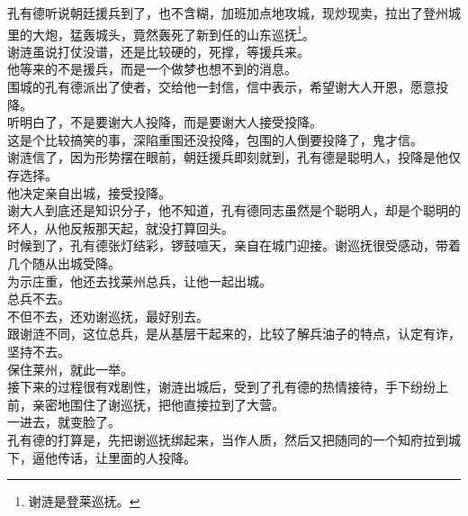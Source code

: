\begin{multicols}{\theparacolNo}
孔有德听说朝廷援兵到了，也不含糊，加班加点地攻城，现炒现卖，拉出了登州城里的大炮，猛轰城头，竟然轰死了新到任的山东巡抚\footnote{谢涟是登莱巡抚。}。\\

谢涟虽说打仗没谱，还是比较硬的，死撑，等援兵来。\\

他等来的不是援兵，而是一个做梦也想不到的消息。\\

围城的孔有德派出了使者，交给他一封信，信中表示，希望谢大人开恩，愿意投降。\\

听明白了，不是要谢大人投降，而是要谢大人接受投降。\\

这是个比较搞笑的事，深陷重围还没投降，包围的人倒要投降了，鬼才信。\\

谢涟信了，因为形势摆在眼前，朝廷援兵即刻就到，孔有德是聪明人，投降是他仅存选择。\\

他决定亲自出城，接受投降。\\

谢大人到底还是知识分子，他不知道，孔有德同志虽然是个聪明人，却是个聪明的坏人，从他反叛那天起，就没打算回头。\\

时候到了，孔有德张灯结彩，锣鼓喧天，亲自在城门迎接。谢巡抚很受感动，带着几个随从出城受降。\\

为示庄重，他还去找莱州总兵，让他一起出城。\\

总兵不去。\\

不但不去，还劝谢巡抚，最好别去。\\

跟谢涟不同，这位总兵，是从基层干起来的，比较了解兵油子的特点，认定有诈，坚持不去。\\

保住莱州，就此一举。\\

接下来的过程很有戏剧性，谢涟出城后，受到了孔有德的热情接待，手下纷纷上前，亲密地围住了谢巡抚，把他直接拉到了大营。\\

一进去，就变脸了。\\

孔有德的打算是，先把谢巡抚绑起来，当作人质，然后又把随同的一个知府拉到城下，逼他传话，让里面的人投降。\\


\end{multicols}
